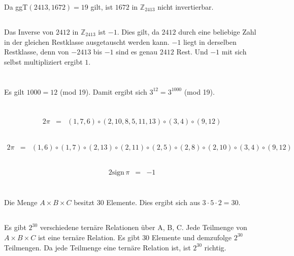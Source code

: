 \documentclass[10pt,a4paper,oneside,ngerman,numbers=noenddot]{scrartcl}
\begin{document}
Da ggT$(2413,1672) = 19$ gilt, ist $1672$ in $\mathbb{Z}_{2413}$ nicht invertierbar.
\subsection{} %
Das Inverse von $2412$ in $\mathbb{Z}_{2413}$ ist $-1$. Dies gilt, da $2412$ durch eine beliebige Zahl in der gleichen Restklasse ausgetauscht werden kann. $-1$ liegt in derselben Restklasse, denn von $-2413$ bis $-1$ sind es genau $2412$ Rest. Und $-1$ mit sich selbst multipliziert ergibt $1$.
\section{} %
Es gilt $1000 = 12$ (mod 19). Damit ergibt sich $3^{12} = 3^{1000}$ (mod 19). %

 
\section{} %
\subsection{} %
	\begin{alignat*}{2}
		\pi &=& (1,7,6) \circ (2,10,8,5,11,13) \circ (3,4) \circ (9,12)
	\end{alignat*}
\subsection{} %
	\begin{alignat*}{2}
		\pi &=& (1,6) \circ (1,7) \circ (2,13) \circ (2,11) \circ (2,5) \circ (2,8) \circ (2,10) \circ (3,4) \circ (9,12)
	\end{alignat*}
\subsection{} %
	\begin{alignat*}{2}
		\text{sign}\, \pi &=& -1
	\end{alignat*}
\section{} %
\subsection{} %
Die Menge $A \times B \times C$ besitzt $30$ Elemente. Dies ergibt sich aus $3 \cdot 5 \cdot 2 = 30$.
\subsection{} %
Es gibt $2^{30}$ verschiedene ternäre Relationen über A, B, C. Jede Teilmenge von $A \times B \times C$ ist eine ternäre Relation. Es gibt $30$ Elemente und demzufolge $2^{30}$ Teilmengen. Da jede Teilmenge eine ternäre Relation ist, ist $2^{30}$ richtig.
\end{document}
